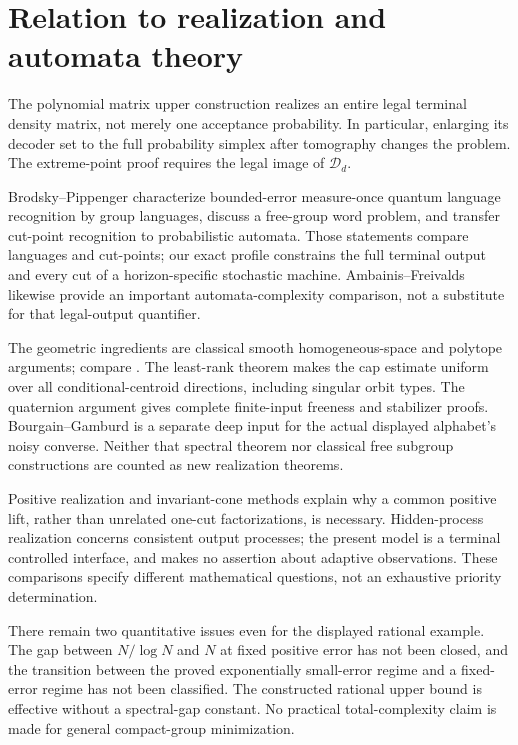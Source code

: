 \section{Relation to realization and automata theory}
The polynomial matrix upper construction realizes an entire legal
terminal density matrix, not merely one acceptance probability. In
particular, enlarging its decoder set to the full probability simplex
after tomography changes the problem. The extreme-point proof requires
the legal image of $\mathcal D_d$.

Brodsky--Pippenger \cite[Theorems~3.3 and 3.6; Lemma~3.5]{BP} characterize
bounded-error measure-once quantum language recognition by group
languages, discuss a free-group word problem, and transfer cut-point
recognition to probabilistic automata. Those statements compare languages
and cut-points; our exact profile constrains the full terminal output and
every cut of a horizon-specific stochastic machine. Ambainis--Freivalds
\cite{AF57} likewise provide an important automata-complexity comparison,
not a substitute for that legal-output quantifier.

The geometric ingredients are classical smooth homogeneous-space and
polytope arguments; compare \cite{Hall,Szarek57}. The least-rank theorem
makes the cap estimate uniform over all conditional-centroid directions,
including singular orbit types. The quaternion argument gives complete
finite-input freeness and stabilizer proofs. Bourgain--Gamburd
\cite[Theorem~1]{BG2012} is a separate deep input for the actual displayed
alphabet's noisy converse. Neither that spectral theorem nor classical
free subgroup constructions are counted as new realization theorems.

Positive realization and invariant-cone methods \cite{BF04,BR} explain
why a common positive lift, rather than unrelated one-cut factorizations,
is necessary. Hidden-process realization \cite{Heller58} concerns
consistent output processes; the present model is a terminal controlled
interface, and makes no assertion about adaptive observations. These
comparisons specify different mathematical questions, not an exhaustive
priority determination.

There remain two quantitative issues even for the displayed rational
example. The gap between $N/\log N$ and $N$ at fixed positive error has
not been closed, and the transition between the proved exponentially
small-error regime and a fixed-error regime has not been classified.
The constructed rational upper bound is effective without a spectral-gap
constant. No practical total-complexity claim is made for general
compact-group minimization.

